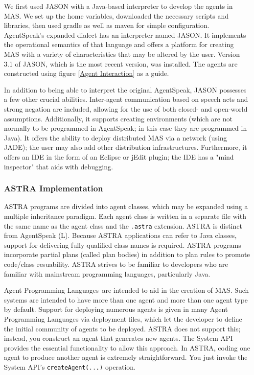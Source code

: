 We first used JASON with a Java-based interpreter to develop the agents in \ac{MAS}. We set up the home variables, downloaded the necessary scripts and libraries, then used gradle as well as maven for simple configuration. AgentSpeak's expanded dialect has an interpreter named JASON. It implements the operational semantics of that language and offers a platform for creating \ac{MAS} with a variety of characteristics that may be altered by the user. Version 3.1 of JASON, which is the most recent version, was installed. The agents are constructed using figure  \ref{Agent Interaction} as a guide.

\vspace{.5cm}

In addition to being able to interpret the original AgentSpeak, JASON possesses a few other crucial abilities. Inter-agent communication based on speech acts and strong negation are included, allowing for the use of both closed- and open-world assumptions. Additionally, it supports creating environments (which are not normally to be programmed in AgentSpeak; in this case they are programmed in Java). It offers the ability to deploy distributed \ac{MAS} via a network (using \ac{JADE}); the user may also add other distribution infrastructures. Furthermore, it offers an \ac{IDE} in the form of an Eclipse or jEdit plugin; the \ac{IDE} has a "mind inspector" that aids with debugging.

\subsubsection{ASTRA Implementation}

ASTRA programs are divided into agent classes, which may be expanded using a multiple inheritance paradigm. Each agent class is written in a separate file with the same name as the agent class and the \texttt{.astra} extension. ASTRA is distinct from AgentSpeak (L). Because ASTRA applications can refer to Java classes, support for delivering fully qualified class names is required. ASTRA programs incorporate partial plans (called plan bodies) in addition to plan rules to promote code/class resuability. ASTRA strives to be familiar to developers who are familiar with mainstream programming languages, particularly Java.

 \vspace{.5cm}
 
Agent Programming Languages are intended to aid in the creation of \ac{MAS}. Such systems are intended to have more than one agent and more than one agent type by default. Support for deploying numerous agents is given in many Agent Programming Languages via deployment files, which let the developer to define the initial community of agents to be deployed. ASTRA does not support this; instead, you construct an agent that generates new agents. The System \ac{API} provides the essential functionality to allow this approach. In ASTRA, coding one agent to produce another agent is extremely straightforward. You just invoke the System \ac{API}'s \texttt{createAgent(...)} operation.

